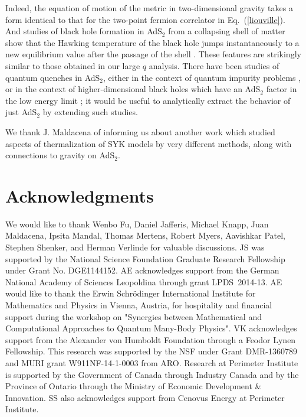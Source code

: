 \documentclass[prx,aps,onecolumn,amsfonts,showpacs,superscriptaddress,preprint,eqsecnum]
{revtex4-1}
\begin{document}
Indeed, the equation of motion of the metric in two-dimensional gravity \cite{AAJP15} takes a form
identical to that for the two-point fermion correlator in Eq.~(\ref{liouville}). And
studies of black hole formation
in AdS$_2$ from a collapsing shell of matter 
show that the Hawking temperature of the black hole jumps instantaneously
to a new equilibrium value after the passage of the shell \cite{HV16,engelsoythesis}. 
These features are strikingly similar to 
those obtained in our large $q$ analysis. There have been studies of quantum quenches in AdS$_2$, either in the context of
quantum impurity problems \cite{Erdmenger17}, or in the context of higher-dimensional black holes which
have an AdS$_2$ factor in the low energy limit \cite{Withers16}; it would be useful to analytically extract the behavior of just AdS$_2$ by extending such studies.

We thank J. Maldacena of informing us about another work \cite{IKJM17} which studied aspects
of thermalization of SYK models by very different methods, along with connections to gravity on AdS$_2$.

\section*{Acknowledgments} 
We would like to thank Wenbo Fu, Daniel Jafferis, Michael Knapp, Juan Maldacena, Ipsita Mandal, Thomas Mertens, Robert Myers, Aavishkar Patel, Stephen Shenker, and Herman Verlinde 
for valuable discussions. 
JS was supported by the National Science Foundation Graduate Research 
Fellowship under Grant No. DGE1144152.
AE acknowledges support from the German National Academy of Sciences 
Leopoldina through grant LPDS~2014-13. AE would like to thank 
the Erwin Schrödinger International Institute for Mathematics and Physics in 
Vienna, Austria, for hospitality and financial support during the workshop on 
"Synergies between Mathematical and Computational Approaches to Quantum 
Many-Body Physics". VK acknowledges support from the Alexander von Humboldt Foundation through a Feodor Lynen Fellowship. This research was supported by the NSF under Grant 
DMR-1360789 and MURI grant W911NF-14-1-0003 from ARO. Research at Perimeter 
Institute is supported by the Government of Canada through Industry Canada and 
by the Province of Ontario through the Ministry of Economic Development \& 
Innovation. SS also acknowledges support from Cenovus Energy at Perimeter 
Institute.
\end{document}
